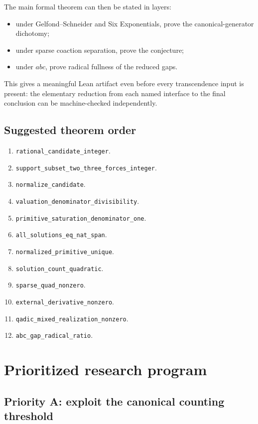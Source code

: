 \documentclass[11pt,oneside]{article}
\theoremstyle{definition}
\begin{document}
The main formal theorem can then be stated in layers:
\begin{itemize}
\item under Gelfond--Schneider and Six Exponentials, prove the canonical-generator dichotomy;
\item under sparse coaction separation, prove the conjecture;
\item under $abc$, prove radical fullness of the reduced gaps.
\end{itemize}
This gives a meaningful Lean artifact even before every transcendence input is present: the elementary reduction from each named interface to the final conclusion can be machine-checked independently.

\subsection{Suggested theorem order}

\begin{enumerate}
\item \texttt{rational\_candidate\_integer}.
\item \texttt{support\_subset\_two\_three\_forces\_integer}.
\item \texttt{normalize\_candidate}.
\item \texttt{valuation\_denominator\_divisibility}.
\item \texttt{primitive\_saturation\_denominator\_one}.
\item \texttt{all\_solutions\_eq\_nat\_span}.
\item \texttt{normalized\_primitive\_unique}.
\item \texttt{solution\_count\_quadratic}.
\item \texttt{sparse\_quad\_nonzero}.
\item \texttt{external\_derivative\_nonzero}.
\item \texttt{qadic\_mixed\_realization\_nonzero}.
\item \texttt{abc\_gap\_radical\_ratio}.
\end{enumerate}

\section{Prioritized research program}

\subsection{Priority A: exploit the canonical counting threshold}
\end{document}
